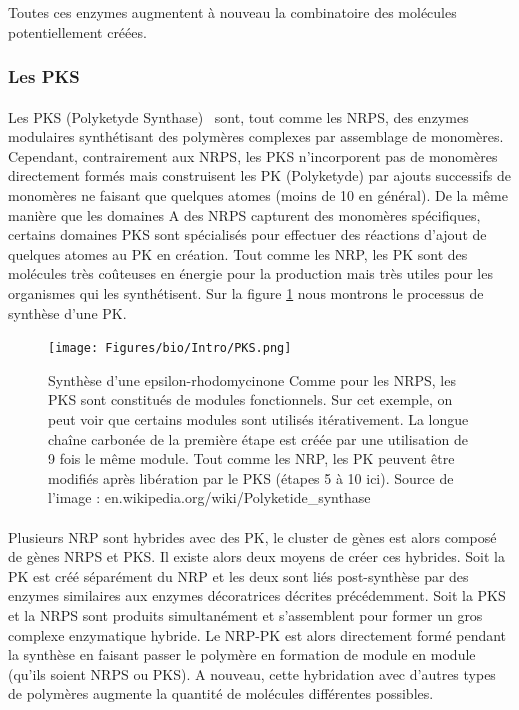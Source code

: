 \documentclass[12pt,french,twoside]{report}
\begin{document}
Toutes ces enzymes augmentent à nouveau la combinatoire des molécules potentiellement créées.



\subsubsection{Les PKS}

\paragraph{}Les PKS (Polyketyde Synthase)~\cite{shen_polyketide_2003,staunton_polyketide_2001} sont, tout comme les NRPS, des enzymes modulaires synthétisant des polymères complexes par assemblage de monomères.
Cependant, contrairement aux NRPS, les PKS n'incorporent pas de monomères directement formés mais construisent les PK (Polyketyde) par ajouts successifs de monomères ne faisant que quelques atomes (moins de 10 en général).
De la même manière que les domaines A des NRPS capturent des monomères spécifiques, certains domaines PKS sont spécialisés pour effectuer des réactions d'ajout de quelques atomes au PK en création.
Tout comme les NRP, les PK sont des molécules très coûteuses en énergie pour la production mais très utiles pour les organismes qui les synthétisent.
Sur la figure \ref{pks} nous montrons le processus de synthèse d'une PK.

\begin{figure}
  \begin{center}
    \texttt{[image: Figures/bio/Intro/PKS.png]}
    \caption{\label{pks}Synthèse d'une epsilon-rhodomycinone
    Comme pour les NRPS, les PKS sont constitués de modules fonctionnels.
    Sur cet exemple, on peut voir que certains modules sont utilisés itérativement.
    La longue chaîne carbonée de la première étape est créée par une utilisation de 9 fois le même module.
    Tout comme les NRP, les PK peuvent être modifiés après libération par le PKS (étapes 5 à 10 ici).
    Source de l'image : en.wikipedia.org/wiki/Polyketide\_synthase}
  \end{center}
\end{figure}

\paragraph{}Plusieurs NRP sont hybrides avec des PK, le cluster de gènes est alors composé de gènes NRPS et PKS.
Il existe alors deux moyens de créer ces hybrides.
Soit la PK est créé séparément du NRP et les deux sont liés post-synthèse par des enzymes similaires aux enzymes décoratrices décrites précédemment.
Soit la PKS et la NRPS sont produits simultanément et s'assemblent pour former un gros complexe enzymatique hybride.
Le NRP-PK est alors directement formé pendant la synthèse en faisant passer le polymère en formation de module en module (qu'ils soient NRPS ou PKS).
A nouveau, cette hybridation avec d'autres types de polymères augmente la quantité de molécules différentes possibles.
\end{document}
